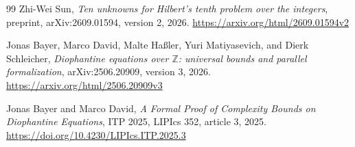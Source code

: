 \documentclass[11pt,a4paper]{article}
\theoremstyle{remark}
\begin{document}
\begin{thebibliography}{99}
Zhi-Wei Sun, \emph{Ten unknowns for Hilbert's tenth problem over the
integers}, preprint, arXiv:2609.01594, version 2, 2026.\newline
\url{https://arxiv.org/html/2609.01594v2}

Jonas Bayer, Marco David, Malte Ha{\ss}ler, Yuri Matiyasevich, and
Dierk Schleicher, \emph{Diophantine equations over $\mathbb Z$:
universal bounds and parallel formalization}, arXiv:2506.20909,
version 3, 2026.\newline
\url{https://arxiv.org/html/2506.20909v3}

Jonas Bayer and Marco David, \emph{A Formal Proof of Complexity Bounds
on Diophantine Equations}, ITP 2025,
LIPIcs 352, article 3, 2025.\newline
\url{https://doi.org/10.4230/LIPIcs.ITP.2025.3}
\end{thebibliography}
\end{document}
